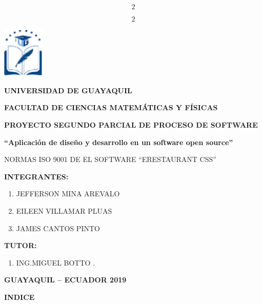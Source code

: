 \documentclass{article} %
\begin{document}

\[2\] 


\[2\] 



\noindent \includegraphics*[width=0.78in, height=0.96in, keepaspectratio=false]{image1}

\noindent \textbf{}

\noindent \textbf{UNIVERSIDAD DE GUAYAQUIL}

\noindent \textbf{FACULTAD DE CIENCIAS MATEM\'{A}TICAS Y F\'{I}SICAS}

\noindent \textbf{}

\noindent \textbf{PROYECTO SEGUNDO PARCIAL DE PROCESO DE SOFTWARE}

\noindent \textbf{``Aplicaci\'{o}n de dise\~{n}o y desarrollo en un software open source''}

\noindent NORMAS ISO 9001 DE EL SOFTWARE ``ERESTAURANT CSS''

\noindent 

\noindent \textbf{INTEGRANTES:}

\noindent \textbf{}

\begin{enumerate}
\item \textbf{ }JEFFERSON MINA AREVALO

\item  EILEEN VILLAMAR PLUAS

\item  JAMES CANTOS PINTO 
\end{enumerate}

\noindent 

\noindent 

\noindent \textbf{TUTOR:}

\begin{enumerate}
\item \textbf{ }ING.MIGUEL BOTTO .
\end{enumerate}

\noindent 

\noindent \textbf{GUAYAQUIL -- ECUADOR 2019}

\noindent \eject 

\noindent \textbf{INDICE}
\end{document}
